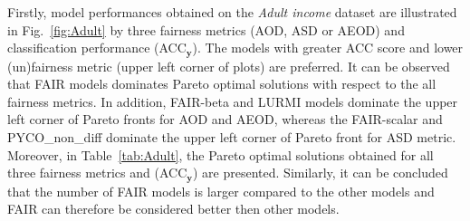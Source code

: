 \documentclass[preprint,12pt]{elsarticle}
\begin{document}
Firstly, model performances obtained on the \textit{Adult income} dataset are illustrated in Fig.~\ref{fig:Adult} by three fairness metrics (AOD, ASD or AEOD) and classification performance (ACC$_\mathbf{y}$). The models with greater ACC score and lower (un)fairness metric (upper left corner of plots) are preferred. It can be observed that FAIR models dominates Pareto optimal solutions with respect to the all fairness metrics. In addition, FAIR-beta and LURMI models dominate the upper left corner of Pareto fronts for AOD and AEOD, whereas the FAIR-scalar and PYCO\_non\_diff dominate the upper left corner of Pareto front for ASD metric. Moreover, in Table~\ref{tab:Adult}, the Pareto optimal solutions obtained for all three fairness metrics and (ACC$_\mathbf{y}$) are presented. Similarly, it can be concluded that the number of FAIR models is larger compared to the other models and FAIR can therefore be considered better then other models.
\end{document}
